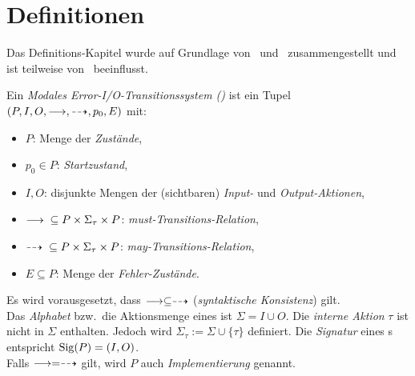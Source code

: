 \section{Definitionen}

Das Definitions-Kapitel wurde auf Grundlage von~\cite{Vogler2015FailSem}
und~\cite{Schinko2016BA} zusammengestellt und ist teilweise
von~\cite{Vogler2016MIA3} beeinflusst.

\begin{Def}
  Ein \emph{Modales Error-I/O-Transitionssystem (\MEIO{})} ist ein Tupel
  $(P,I,O,\must,\may,p_0,E)$ mit:
  \begin{itemize}
    \item $P$: Menge der \emph{Zustände},
    \item $p_0\in P$: \emph{Startzustand},
    \item $I,O$: disjunkte Mengen der (sichtbaren) \emph{Input-} und
      \emph{Output-Aktionen},
    \item $\must{} \subseteq P\times \Sigma_{\tau}\times P$:
      \emph{must-Transitions-Relation},
    \item $\may{} \subseteq P\times \Sigma_{\tau}\times P$:
      \emph{may-Transitions-Relation},
    \item $E\subseteq P$: Menge der \emph{Fehler-Zustände}.
  \end{itemize}
  Es wird vorausgesetzt, dass $\must\subseteq\may$ (\emph{syntaktische
  Konsistenz}) gilt.\\
  Das \emph{Alphabet} bzw.\ die Aktionsmenge eines \MEIO{} ist $\Sigma = I\cup
  O$. Die \emph{interne Aktion} $\tau$ ist nicht in $\Sigma$ enthalten. Jedoch
  wird $\Sigma_{\tau} := \Sigma \cup \{\tau\}$ definiert. Die \emph{Signatur}
  eines \MEIO{}s entspricht $\mathrm{Sig} (P)=(I,O)$.\\
  Falls $\must =\may$ gilt, wird $P$ auch \emph{Implementierung} genannt.
\end{Def}

